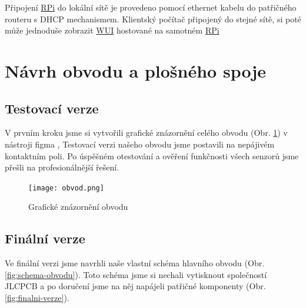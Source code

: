 \documentclass[czech,12pt,a4paper]{article}
\begin{document}
Připojení \underline{\ac{RPi}} do lokální sítě je provedeno pomocí ethernet kabelu do patřičného routeru s \ac{DHCP} mechanismem. Klientský počítač připojený do stejné sítě, si poté může jednoduše zobrazit \underline{\ac{WUI}} hostované na samotném \underline{\ac{RPi}}

\clearpage

\section{Návrh obvodu a plošného spoje} \label{secPCB}

\subsection{Testovací verze}

V prvním kroku jsme si vytvořili grafické znázornění celého obvodu (Obr. \ref{fig:graficke-znazorneni-obvodu}) v nástroji figma \cite{figma}, Testovací verzi našeho obvodu jsme postavili na nepájivém kontaktním poli. Po úspěšném otestování a ověření funkčnosti všech senzorů jsme přešli na profesionálnější řešení.

\noindent\begin{figure}[h]
	\texttt{[image: obvod.png]}
	\caption{Grafické znázornění obvodu}
	\label{fig:graficke-znazorneni-obvodu}
\end{figure}

\clearpage

\subsection{Finální verze}

Ve finální verzi jsme navrhli naše vlastní schéma hlavního obvodu (Obr. \ref{fig:schema-obvodu}). Toto schéma jsme si nechali vytisknout společností JLCPCB a po doručení jsme na něj napájeli patřičné komponenty (Obr. \ref{fig:finalni-verze}).
\end{document}
